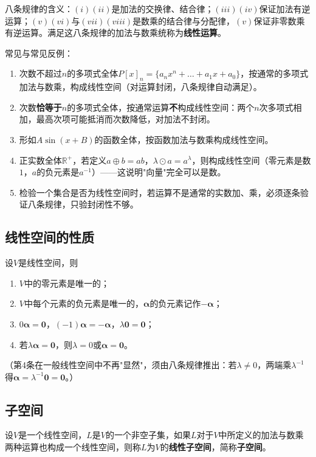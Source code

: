 八条规律的含义：$(i)(ii)$是加法的交换律、结合律；$(iii)(iv)$保证加法有逆运算；$(v)(vi)$与$(vii)(viii)$是数乘的结合律与分配律，$(v)$保证非零数乘有逆运算。满足这八条规律的加法与数乘统称为\textbf{线性运算}。


常见与常见反例：
\begin{enumerate}
    \item 次数不超过$n$的多项式全体$P[x]_n=\{a_nx^{n}+\dots+a_1x+a_0\}$，按通常的多项式加法与数乘，构成线性空间（对运算封闭，八条规律自动满足）。
    \item 次数\textbf{恰等于}$n$的多项式全体，按通常运算\textbf{不}构成线性空间：两个$n$次多项式相加，最高次项可能抵消而次数降低，对加法不封闭。
    \item 形如$A\sin(x+B)$的函数全体，按函数加法与数乘构成线性空间。
    \item 正实数全体$\mathbb{R}^{+}$，若定义$a\oplus b=ab$，$\lambda\odot a=a^{\lambda}$，则构成线性空间（零元素是数$1$，$a$的负元素是$a^{-1}$）——这说明"向量"完全可以是数。
    \item 检验一个集合是否为线性空间时，若运算不是通常的实数加、乘，必须逐条验证八条规律，只验封闭性不够。
\end{enumerate}

\subsection{线性空间的性质}
设$V$是线性空间，则
\begin{enumerate}
    \item $V$中的零元素是唯一的；
    \item $V$中每个元素的负元素是唯一的，$\boldsymbol{\alpha}$的负元素记作$-\boldsymbol{\alpha}$；
    \item $0\boldsymbol{\alpha}=\boldsymbol{0}$，$(-1)\boldsymbol{\alpha}=-\boldsymbol{\alpha}$，$\lambda\boldsymbol{0}=\boldsymbol{0}$；
    \item 若$\lambda\boldsymbol{\alpha}=\boldsymbol{0}$，则$\lambda=0$或$\boldsymbol{\alpha}=\boldsymbol{0}$。
\end{enumerate}
（第4条在一般线性空间中不再"显然"，须由八条规律推出：若$\lambda\ne0$，两端乘$\lambda^{-1}$得$\boldsymbol{\alpha}=\lambda^{-1}\boldsymbol{0}=\boldsymbol{0}$。）

\subsection{子空间}
\begin{definition}[子空间]
设$V$是一个线性空间，$L$是$V$的一个非空子集，如果$L$对于$V$中所定义的加法与数乘两种运算也构成一个线性空间，则称$L$为$V$的\textbf{线性子空间}，简称\textbf{子空间}。
\end{definition}

